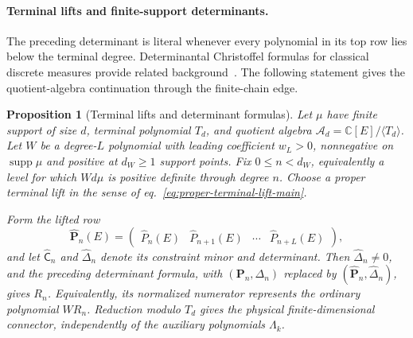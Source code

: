 \documentclass[a4paper,11pt]{article}
\def\dd{d}%
\newtheorem{proposition}{Proposition}[section]
\theoremstyle{definition}
\theoremstyle{remark}
\newcommand{\dd}{\mathrm d}
\newcommand{\CC}{\mathbb C}
\newcommand{\cA}{\mathcal A}
\newcommand{\supp}{\operatorname{supp}}
\begin{document}
\paragraph{Terminal lifts and finite-support determinants.}
The preceding determinant is literal whenever every polynomial in its top row lies below the terminal degree. Determinantal Christoffel formulas for classical discrete measures provide related background~\cite{DuranChristoffel2021}. 
The following statement gives the quotient-algebra continuation through the finite-chain edge.

\begin{proposition}[Terminal lifts and determinant formulas]
\label{prop:terminal-lift-determinant}
Let $\mu$ have finite support of size $d$, terminal polynomial $T_d$, and quotient algebra $\cA_d=\CC[E]/\langle T_d\rangle$. Let $W$ be a degree-$L$ polynomial with leading coefficient $w_L>0$, nonnegative on $\supp\mu$ and positive at $d_W\ge1$ support points. Fix $0\le n<d_W$, equivalently a level for which $W\dd\mu$ is positive definite through degree $n$. Choose a proper terminal lift in the sense of eq.~\eqref{eq:proper-terminal-lift-main}.

Form the lifted row
\begin{equation}
   \widehat{\mathbf P}_n(E)=
   \begin{pmatrix}
      \widehat P_n(E)&\widehat P_{n+1}(E)&\cdots&
      \widehat P_{n+L}(E)
   \end{pmatrix},
\end{equation}
and let $\widehat{\mathsf C}_n$ and $\widehat\Delta_n$ denote its constraint minor and determinant. Then $\widehat\Delta_n\ne0$, and the preceding determinant formula, with $(\mathbf P_n,\Delta_n)$ replaced by $(\widehat{\mathbf P}_n,\widehat\Delta_n)$, gives $R_n$. Equivalently, its normalized numerator represents the ordinary polynomial $WR_n$. Reduction modulo $T_d$ gives the physical finite-dimensional connector, independently of the auxiliary polynomials $\Lambda_k$.
\end{proposition}
\end{document}
